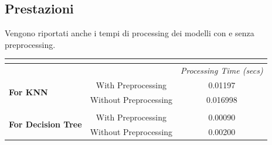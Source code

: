 \subsection{Prestazioni}
Vengono riportati anche i tempi di processing dei modelli con e senza preprocessing.
\begin{table}[ht]
\centering
\begin{tabular}{@{}lcccll@{}}
\toprule
 & \multicolumn{1}{l}{}                                        & \multicolumn{4}{c}{\textbf{}}                                         \\ \midrule
\multicolumn{1}{|l|}{}                                            & \multicolumn{1}{c|}{}                                       & \multicolumn{4}{c|}{\textit{Processing Time (secs)}}                  \\ \midrule
\multicolumn{1}{|l|}{\multirow{4}{*}{\textbf{For KNN}}}           & \multicolumn{1}{c|}{With Preprocessing}                     & \multicolumn{4}{c|}{0.01197}                                          \\ \cmidrule(l){2-6} 
\multicolumn{1}{|l|}{}                                            & \multicolumn{1}{c|}{\multirow{3}{*}{Without Preprocessing}} & \multicolumn{4}{c|}{\multirow{3}{*}{0.016998}}                        \\
\multicolumn{1}{|l|}{}                                            & \multicolumn{1}{c|}{}                                       & \multicolumn{4}{c|}{}                                                 \\
\multicolumn{1}{|l|}{}                                            & \multicolumn{1}{c|}{}                                       & \multicolumn{4}{c|}{}                                                 \\ \midrule
                                                                  &                                                             &  &                      & \multicolumn{1}{c}{} & \multicolumn{1}{c}{} \\ \midrule
\multicolumn{1}{|l|}{\multirow{5}{*}{\textbf{For Decision Tree}}} & \multicolumn{1}{c|}{With Preprocessing}                     & \multicolumn{4}{c|}{0.00090}                                          \\ \cmidrule(l){2-6} 
\multicolumn{1}{|l|}{}                                            & \multicolumn{1}{c|}{\multirow{3}{*}{Without Preprocessing}} & \multicolumn{4}{c|}{\multirow{3}{*}{0.00200}}                         \\

\end{tabular}
\end{table}

